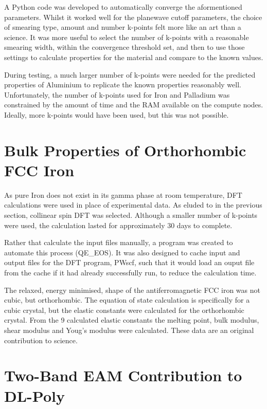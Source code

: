 A Python code was developed to automatically converge the aformentioned parameters.  Whilst it worked well for the planewave cutoff parameters, the choice of smearing type, amount and number k-points felt more like an art than a science.  It was more useful to select the number of k-points with a reasonable smearing width, within the convergence threshold set, and then to use those settings to calculate properties for the material and compare to the known values.

During testing, a much larger number of k-points were needed for the predicted properties of Aluminium to replicate the known properties reasonably well.  Unfortunately, the number of k-points used for Iron and Palladium was constrained by the amount of time and the RAM available on the compute nodes.  Ideally, more k-points would have been used, but this was not possible.



\section{Bulk Properties of Orthorhombic FCC Iron}

As pure Iron does not exist in its gamma phase at room temperature, DFT calculations were used in place of experimental data.  As eluded to in the previous section, collinear spin DFT was selected.  Although a smaller number of k-points were used, the calculation lasted for approximately 30 days to complete.

Rather that calculate the input files manually, a program was created to automate this process (QE\_EOS).  It was also designed to cache input and output files for the DFT program, PWscf, such that it would load an ouput file from the cache if it had already successfully run, to reduce the calculation time.

The relaxed, energy minimised, shape of the antiferromagnetic FCC iron was not cubic, but orthorhombic.  The equation of state calculation is specifically for a cubic crystal, but the elastic constants were calculated for the orthorhombic crystal.  From the 9 calculated elastic constants the melting point, bulk modulus, shear modulus and Youg's modulus were calculated.  These data are an original contribution to science.



\section{Two-Band EAM Contribution to DL-Poly}


